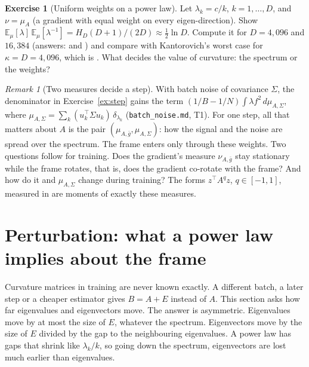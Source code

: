 \documentclass[11pt,a4paper]{article}
\newcommand{\E}{\mathbb{E}}
\newcommand{\study}[1]{\path{#1}}
\theoremstyle{plain}
\theoremstyle{definition}
\newtheorem{exercise}[proposition]{Exercise}
\theoremstyle{remark}
\newtheorem{remark}[proposition]{Remark}
\begin{document}
\begin{exercise}[Uniform weights on a power law]\label{ex:kantpower}
Let $\lambda_k=c/k$, $k=1,\dots,D$, and $\nu=\mu_A$ (a gradient with equal weight on every eigen-direction). Show
$\E_\mu[\lambda]\,\E_\mu[\lambda^{-1}]=H_D(D+1)/(2D)\approx\frac12\ln D$. Compute it for $D=4{,}096$ and $16{,}384$
(answers: \NumKantFourK{} and \NumKantSixteenK) and compare with Kantorovich's worst case for $\kappa=D=4{,}096$,
which is \NumKantWorstFourK. What decides the value of curvature: the spectrum or the weights?
\end{exercise}

\begin{remark}[Two measures decide a step]\label{rem:twomeasures}
With batch noise of covariance $\Sigma$, the denominator in Exercise~\ref{ex:step} gains the term
$(1/B-1/N)\int\lambda f^2\,d\mu_{A,\Sigma}$, where $\mu_{A,\Sigma}=\sum_k(u_k^\top\Sigma u_k)\,\delta_{\lambda_k}$
(\texttt{batch\_noise.md}, T1). For one step, all that matters about $A$ is the pair $(\mu_{A,\bar g},\mu_{A,\Sigma})$:
how the signal and the noise are spread over the spectrum. The frame enters only through these weights. Two questions
follow for training. Does the gradient's measure $\nu_{A,\bar g}$ stay stationary while the frame rotates, that is,
does the gradient co-rotate with the frame? And how do it and $\mu_{A,\Sigma}$ change during training? The forms
$z^\top A^qz$, $q\in[-1,1]$, measured in \study{noise_scale_20261021} are moments of exactly these measures.
\end{remark}

\section{Perturbation: what a power law implies about the frame}\label{sec:perturbation}

Curvature matrices in training are never known exactly. A different batch, a later step or a cheaper estimator gives
$B=A+E$ instead of $A$. This section asks how far eigenvalues and eigenvectors move. The answer is asymmetric.
Eigenvalues move by at most the size of $E$, whatever the spectrum. Eigenvectors move by the size of $E$ divided by
the gap to the neighbouring eigenvalues. A power law has gaps that shrink like $\lambda_k/k$, so going down the
spectrum, eigenvectors are lost much earlier than eigenvalues.
\end{document}
